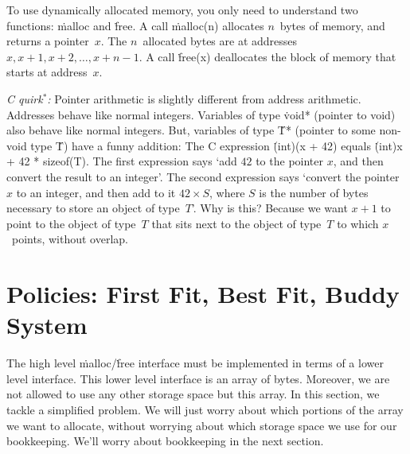 To use dynamically allocated memory, you only need to understand two functions:
  \.{malloc} and \.{free}.
A call \.{malloc(n)} allocates $n$~bytes of memory,
  and returns a pointer~$x$.
The $n$~allocated bytes are at addresses $x, x+1, x+2,\ldots, x+n-1$.
A call \.{free(x)} deallocates the block of memory that starts at address~$x$.

\smallskip\noindent
\emph{C quirk${}^*$:}\enspace
Pointer arithmetic is slightly different from address arithmetic.
Addresses behave like normal integers.
Variables of type \.{void*} (pointer to void) also behave like normal integers.
But, variables of type \.{T*} (pointer to some non-void type \.{T})
  have a funny addition:
The C expression \.{(int)(x + 42)} equals \.{(int)x + 42 * sizeof(T)}.
The first expression says `add $42$ to the pointer $x$,
  and then convert the result to an integer'.
The second expression says `convert the pointer $x$ to an integer,
  and then add to it $42\times S$,
  where $S$ is the number of bytes necessary to store an object of type~$T$'.
Why is this?
Because we want $x+1$ to point to the object of type~$T$
  that sits next to the object of type~$T$ to which $x$~points,
  without overlap.


\section*{Policies: First Fit, Best Fit, Buddy System}

The high level \.{malloc}\slash\.{free} interface
  must be implemented in terms of a lower level interface.
This lower level interface is an array of bytes.
Moreover, we are not allowed to use any other storage space but this array.
In this section, we tackle a simplified problem.
We will just worry about which portions of the array we want to allocate,
  without worrying about which storage space we use for our bookkeeping.
We'll worry about bookkeeping in the next section.

